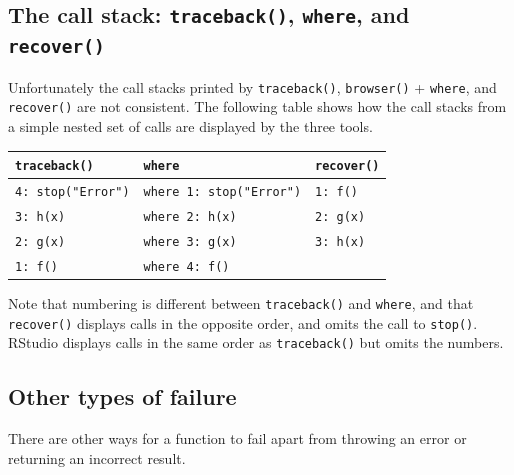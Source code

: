 \subsection{The call stack: \texttt{traceback()}, \texttt{where}, and
\texttt{recover()}}

Unfortunately the call stacks printed by \texttt{traceback()},
\texttt{browser()} + \texttt{where}, and \texttt{recover()} are not
consistent. The following table shows how the call stacks from a simple
nested set of calls are displayed by the three tools. 

\begin{longtable}[c]{@{}lll@{}}
\toprule
\texttt{traceback()} & \texttt{where} &
\texttt{recover()}\tabularnewline
\midrule
\endhead
\texttt{4: stop("Error")} & \texttt{where 1: stop("Error")} &
\texttt{1: f()}\tabularnewline
\texttt{3: h(x)} & \texttt{where 2: h(x)} &
\texttt{2: g(x)}\tabularnewline
\texttt{2: g(x)} & \texttt{where 3: g(x)} &
\texttt{3: h(x)}\tabularnewline
\texttt{1: f()} & \texttt{where 4: f()} &\tabularnewline
\bottomrule
\end{longtable}

Note that numbering is different between \texttt{traceback()} and
\texttt{where}, and that \texttt{recover()} displays calls in the
opposite order, and omits the call to \texttt{stop()}. RStudio displays
calls in the same order as \texttt{traceback()} but omits the numbers.

\subsection{Other types of failure}

There are other ways for a function to fail apart from throwing an error
or returning an incorrect result.

